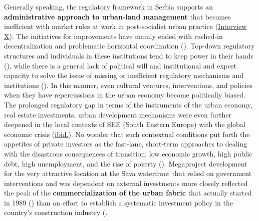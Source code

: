 \documentclass[11pt]{report}
\begin{document}
Generally speaking, the regulatory framework in Serbia supports an \textbf{administrative approach to urban-land management} that becomes inefficient with market rules at work in post-socialist urban practice
(\href{InterviewX}{Interview X}).
The initiatives for improvements have mainly ended with rushed-in decentralization and problematic horizontal coordination
(\cite{WOrldBank2015}).
Top-down regulatory structures and individuals in these institutions tend to keep power in their hands (\href{ref}{\citealt{vujovic_belgrades_2007}}), while there is a general lack of political will and institutional and expert capacity to solve the issue of missing or inefficient regulatory mechanisms and institutions (\href{ref}{\citealt{zekovic_planning_2015}}).
In this manner, even cultural ventures, interventions, and policies when they have repercussions in the urban economy become politically biased.
\\

The prolonged regulatory gap in terms of the  instruments  of  the  urban economy, real estate investments, urban development mechanisms were even further deepened in the local contexts of SEE (South Eastern Europe) with the global economic crisis 
(\href{Zekovic}{ibid.}).
No wonder that such contextual conditions put forth the appetites of private investors as the fast-lane, short-term approaches to dealing with the disastrous consequences of transition: low economic growth, high public debt, high unemployment, and the rise of poverty (\href{ref}{\citealt{world_bank_cities_2000}}).
Megaproject development for the very attractive location at the Sava waterfront that relied on government interventions and was dependent on external investments more  closely reflected the peak of the  \textbf{commercialization of the urban fabric} that actually started in 1989 (\href{ref}{\citealt{hirt_belgrade_2009}}) than an effort to establish a systematic investment policy in the country's construction industry (\cite{WorldBank2013}.
\\
\end{document}
